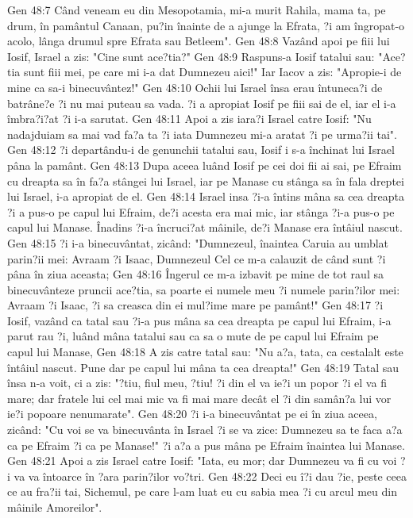 Gen 48:7  Când veneam eu din Mesopotamia, mi-a murit Rahila, mama ta, pe drum, în pamântul Canaan, pu?in înainte de a ajunge la Efrata, ?i am îngropat-o acolo, lânga drumul spre Efrata sau Betleem".
Gen 48:8  Vazând apoi pe fiii lui Iosif, Israel a zis: "Cine sunt ace?tia?"
Gen 48:9  Raspuns-a Iosif tatalui sau: "Ace?tia sunt fiii mei, pe care mi i-a dat Dumnezeu aici!" Iar Iacov a zis: "Apropie-i de mine ca sa-i binecuvântez!"
Gen 48:10  Ochii lui Israel însa erau întuneca?i de batrâne?e ?i nu mai puteau sa vada. ?i a apropiat Iosif pe fiii sai de el, iar el i-a îmbra?i?at ?i i-a sarutat.
Gen 48:11  Apoi a zis iara?i Israel catre Iosif: "Nu nadajduiam sa mai vad fa?a ta ?i iata Dumnezeu mi-a aratat ?i pe urma?ii tai".
Gen 48:12  ?i departându-i de genunchii tatalui sau, Iosif i s-a închinat lui Israel pâna la pamânt.
Gen 48:13  Dupa aceea luând Iosif pe cei doi fii ai sai, pe Efraim cu dreapta sa în fa?a stângei lui Israel, iar pe Manase cu stânga sa în fala dreptei lui Israel, i-a apropiat de el.
Gen 48:14  Israel insa ?i-a întins mâna sa cea dreapta ?i a pus-o pe capul lui Efraim, de?i acesta era mai mic, iar stânga ?i-a pus-o pe capul lui Manase. Înadins ?i-a încruci?at mâinile, de?i Manase era întâiul nascut.
Gen 48:15  ?i i-a binecuvântat, zicând: "Dumnezeul, înaintea Caruia au umblat parin?ii mei: Avraam ?i Isaac, Dumnezeul Cel ce m-a calauzit de când sunt ?i pâna în ziua aceasta;
Gen 48:16  Îngerul ce m-a izbavit pe mine de tot raul sa binecuvânteze pruncii ace?tia, sa poarte ei numele meu ?i numele parin?ilor mei: Avraam ?i Isaac, ?i sa creasca din ei mul?ime mare pe pamânt!"
Gen 48:17  ?i Iosif, vazând ca tatal sau ?i-a pus mâna sa cea dreapta pe capul lui Efraim, i-a parut rau ?i, luând mâna tatalui sau ca sa o mute de pe capul lui Efraim pe capul lui Manase,
Gen 48:18  A zis catre tatal sau: "Nu a?a, tata, ca cestalalt este întâiul nascut. Pune dar pe capul lui mâna ta cea dreapta!"
Gen 48:19  Tatal sau însa n-a voit, ci a zis: "?tiu, fiul meu, ?tiu! ?i din el va ie?i un popor ?i el va fi mare; dar fratele lui cel mai mic va fi mai mare decât el ?i din samân?a lui vor ie?i popoare nenumarate".
Gen 48:20  ?i i-a binecuvântat pe ei în ziua aceea, zicând: "Cu voi se va binecuvânta în Israel ?i se va zice: Dumnezeu sa te faca a?a ca pe Efraim ?i ca pe Manase!" ?i a?a a pus mâna pe Efraim înaintea lui Manase.
Gen 48:21  Apoi a zis Israel catre Iosif: "Iata, eu mor; dar Dumnezeu va fi cu voi ?i va va întoarce în ?ara parin?ilor vo?tri.
Gen 48:22  Deci eu î?i dau ?ie, peste ceea ce au fra?ii tai, Sichemul, pe care l-am luat eu cu sabia mea ?i cu arcul meu din mâinile Amoreilor".
